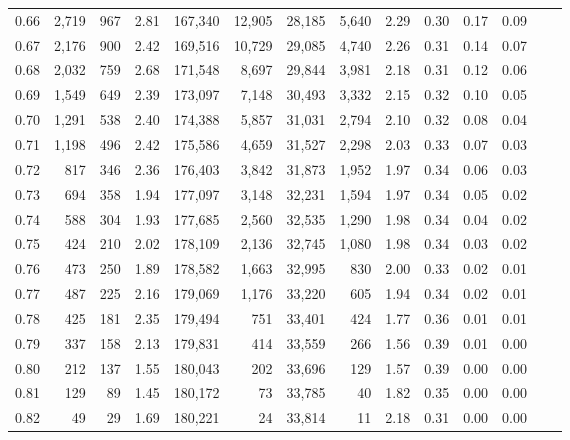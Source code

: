 \begin{tabular}{rrrrrrrrrrrrrr}
0.66 &  2,719 &    967 &    2.81 &  167,340 &   12,905 &  28,185 &   5,640 &  2.29 &  0.30 &  0.17 &      0.09 \\
0.67 &  2,176 &    900 &    2.42 &  169,516 &   10,729 &  29,085 &   4,740 &  2.26 &  0.31 &  0.14 &      0.07 \\
0.68 &  2,032 &    759 &    2.68 &  171,548 &    8,697 &  29,844 &   3,981 &  2.18 &  0.31 &  0.12 &      0.06 \\
0.69 &  1,549 &    649 &    2.39 &  173,097 &    7,148 &  30,493 &   3,332 &  2.15 &  0.32 &  0.10 &      0.05 \\
0.70 &  1,291 &    538 &    2.40 &  174,388 &    5,857 &  31,031 &   2,794 &  2.10 &  0.32 &  0.08 &      0.04 \\
0.71 &  1,198 &    496 &    2.42 &  175,586 &    4,659 &  31,527 &   2,298 &  2.03 &  0.33 &  0.07 &      0.03 \\
0.72 &    817 &    346 &    2.36 &  176,403 &    3,842 &  31,873 &   1,952 &  1.97 &  0.34 &  0.06 &      0.03 \\
0.73 &    694 &    358 &    1.94 &  177,097 &    3,148 &  32,231 &   1,594 &  1.97 &  0.34 &  0.05 &      0.02 \\
0.74 &    588 &    304 &    1.93 &  177,685 &    2,560 &  32,535 &   1,290 &  1.98 &  0.34 &  0.04 &      0.02 \\
0.75 &    424 &    210 &    2.02 &  178,109 &    2,136 &  32,745 &   1,080 &  1.98 &  0.34 &  0.03 &      0.02 \\
0.76 &    473 &    250 &    1.89 &  178,582 &    1,663 &  32,995 &     830 &  2.00 &  0.33 &  0.02 &      0.01 \\
0.77 &    487 &    225 &    2.16 &  179,069 &    1,176 &  33,220 &     605 &  1.94 &  0.34 &  0.02 &      0.01 \\
0.78 &    425 &    181 &    2.35 &  179,494 &      751 &  33,401 &     424 &  1.77 &  0.36 &  0.01 &      0.01 \\
0.79 &    337 &    158 &    2.13 &  179,831 &      414 &  33,559 &     266 &  1.56 &  0.39 &  0.01 &      0.00 \\
0.80 &    212 &    137 &    1.55 &  180,043 &      202 &  33,696 &     129 &  1.57 &  0.39 &  0.00 &      0.00 \\
0.81 &    129 &     89 &    1.45 &  180,172 &       73 &  33,785 &      40 &  1.82 &  0.35 &  0.00 &      0.00 \\
0.82 &     49 &     29 &    1.69 &  180,221 &       24 &  33,814 &      11 &  2.18 &  0.31 &  0.00 &      0.00 \\

\end{tabular}
